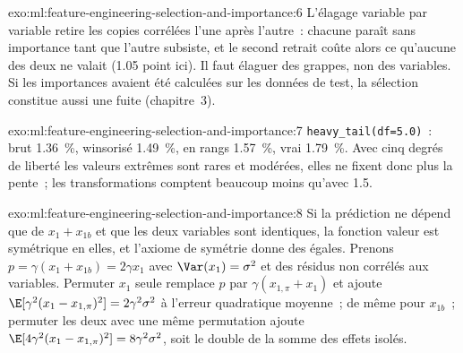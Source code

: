\begin{solution}{exo:ml:feature-engineering-selection-and-importance:6}
L'élagage variable par variable retire les copies corrélées l'une après l'autre~: chacune paraît sans importance tant que l'autre subsiste, et
le second retrait coûte alors ce qu'aucune des deux ne valait (1.05 point ici). Il faut élaguer des grappes, non des variables. Si les
importances avaient été calculées sur les données de test, la sélection constitue aussi une fuite (chapitre~3).
\end{solution}

\begin{solution}{exo:ml:feature-engineering-selection-and-importance:7}
\texttt{heavy\_tail(df=5.0)}~: brut 1.36~\%, winsorisé 1.49~\%, en rangs 1.57~\%, vrai 1.79~\%. Avec cinq degrés de liberté
les valeurs extrêmes sont rares et modérées, elles ne fixent donc plus la pente~; les transformations comptent beaucoup moins qu'avec 1.5.
\end{solution}

\begin{solution}{exo:ml:feature-engineering-selection-and-importance:8}
Si la prédiction ne dépend que de $x_1 + x_{1b}$ et que les deux variables sont identiques, la fonction valeur est symétrique en elles, et
l'axiome de symétrie donne des  égales. Prenons $p = \gamma(x_1 + x_{1b}) = 2\gamma x_1$ avec $\Var(x_1) = \sigma^2$
et des résidus non corrélés aux variables. Permuter $x_1$ seule remplace $p$ par $\gamma(x_{1,\pi} + x_1)$ et ajoute
$\E[\gamma^2(x_1 - x_{1,\pi})^2] = 2\gamma^2\sigma^2$ à l'erreur quadratique moyenne~; de même pour $x_{1b}$~; permuter les deux avec
une même permutation ajoute $\E[4\gamma^2(x_1 - x_{1,\pi})^2] = 8\gamma^2\sigma^2$, soit le double de la somme des effets isolés.
\end{solution}

